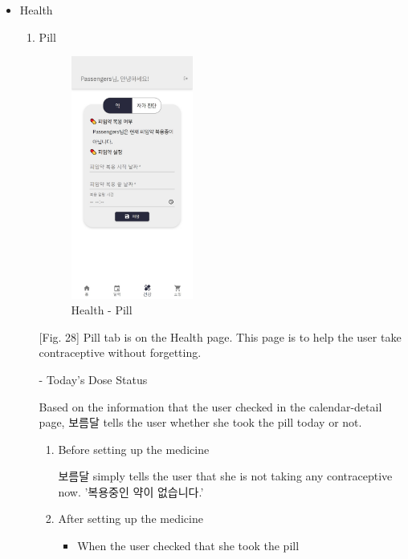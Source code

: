 \documentclass[conference]{IEEEtran}
\begin{document}
\begin{itemize}
\begin{enumerate}
        [Fig. 27] If it is entered correctly without any errors, a notification window will appear, '선택한 날짜의 정보가 입력되었습니다.' and the details entered on that date will be saved.

    \end{enumerate}
    \item Health 
    
    \begin{enumerate}
    \setlength{\parindent}{2ex}
        \item Pill
        
        \begin{figure}[ht]
        \includegraphics[width=4cm, height=8cm, center]{pill main.jpg}
        \caption{Health - Pill}
        \label{fig28}
        \end{figure}
        
        [Fig. 28] Pill tab is on the Health page. This page is to help the user take contraceptive without forgetting. 
        
        - Today's Dose Status
        
        Based on the information that the user checked in the calendar-detail page, 보름달 tells the user whether she took the pill today or not.
        
        \begin{enumerate}
            \item Before setting up the medicine
            
            \setlength{\parindent}{2ex} 보름달 simply tells the user that she is not taking any contraceptive now. '복용중인 약이 없습니다.'
            \item After setting up the medicine 
            
            \begin{itemize}
                \item When the user checked that she took the pill
                

\end{itemize}
\end{enumerate}
\end{enumerate}
\end{itemize}
\end{document}
